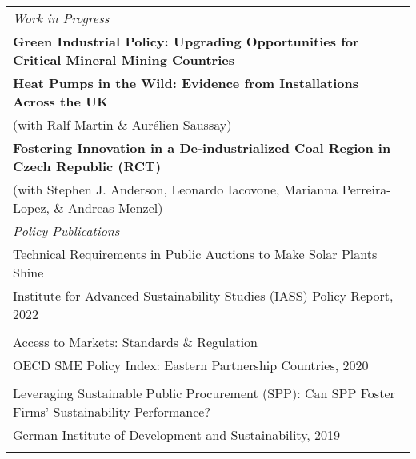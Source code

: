 \documentclass[10pt,a4paper]{article}
\begin{document}
\begin{tabular}{@{}p{\textwidth}@{}}
\vspace{1mm}
\textit{\large Work in Progress} \\
\vspace{0.1mm}
\hspace{5mm}\textbf{Green Industrial Policy: Upgrading Opportunities for Critical Mineral Mining Countries} \\
\vspace{0.1mm}
\hspace{5mm}\textbf{Heat Pumps in the Wild: Evidence from Installations Across the UK} \\
\hspace{5mm}(with Ralf Martin \& Aurélien Saussay) \\
\vspace{0.1mm}
\hspace{5mm}\textbf{Fostering Innovation in a De-industrialized Coal Region in Czech Republic (RCT)} \\
\hspace{5mm}(with Stephen J. Anderson, Leonardo Iacovone, Marianna Perreira-Lopez, \& Andreas Menzel) \\
\vspace{1mm}

\textit{\large Policy Publications} \\
\vspace{0.5mm}
\hspace{5mm}Technical Requirements in Public Auctions to Make Solar Plants Shine \\
\hspace{5mm}Institute for Advanced Sustainability Studies (IASS) Policy Report, 2022 \\
\vspace{0.1mm} \\
\hspace{5mm}Access to Markets: Standards \& Regulation \\
\hspace{5mm}OECD SME Policy Index: Eastern Partnership Countries, 2020 \\
\vspace{0.1mm} \\
\hspace{5mm}Leveraging Sustainable Public Procurement (SPP): Can SPP Foster Firms’ Sustainability Performance? \\
\hspace{5mm}German Institute of Development and Sustainability, 2019 \\
\vspace{1mm}

\end{tabular}
\end{document}
